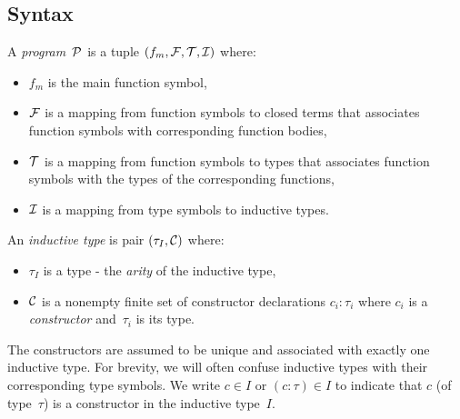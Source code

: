 \documentclass[
    9pt,            %
    techreport,        %
    affiltop,       %
]{art}
\begin{document}
\subsection{Syntax}\label{sec_syntax}

A \JuvixCore{} \emph{program}~$\mathcal{P}$ is a tuple $(f_m,\mathcal{F},\mathcal{T},\mathcal{I})$ where:
\begin{itemize}
\item $f_m$ is the main function symbol,
\item $\mathcal{F}$ is a mapping from function symbols to closed terms that
associates function symbols with corresponding function bodies,
\item $\mathcal{T}$ is a mapping from function symbols to types that associates
function symbols with the types of the corresponding functions,
\item $\mathcal{I}$ is a mapping from type symbols to inductive types.
\end{itemize}
An \emph{inductive type} is pair $(\tau_I,\mathcal{C})$ where:
\begin{itemize}
\item $\tau_I$ is a type - the \emph{arity} of the inductive type,
\item $\mathcal{C}$ is a nonempty finite set of constructor declarations $c_i :
\tau_i$ where $c_i$ is a \emph{constructor} and~$\tau_i$ is its type.
\end{itemize}
The constructors are assumed to be unique and associated with exactly one
inductive type. For brevity, we will often confuse inductive types with
their corresponding type symbols. We write $c \in I$ or $(c : \tau) \in I$
to indicate that $c$ (of type~$\tau$) is a constructor in the inductive
type~$I$.
\end{document}
